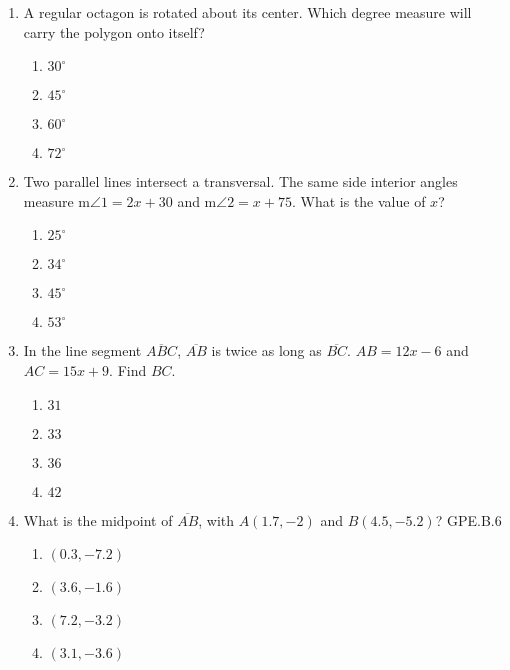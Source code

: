 \begin{enumerate}
\item A regular octagon is rotated about its center. Which degree measure will carry the polygon onto itself? 
\begin{multicols}{2}
\begin{enumerate}
  \item $30^\circ$
  \item $45^\circ$
  \item $60^\circ$
  \item $72^\circ$
\end{enumerate}
\end{multicols}

\item Two parallel lines intersect a transversal. The same side interior angles measure m$\angle 1 = 2x+30$ and m$\angle 2 = x+75$. What is the value of $x$?
\begin{multicols}{2}
  \begin{enumerate}
    \item $25^\circ$
    \item $34^\circ$
    \item $45^\circ$
    \item $53^\circ$
  \end{enumerate}
  \end{multicols}

\newpage
\item In the line segment $\overline{ABC}$, $\overline{AB}$ is twice as long as $\overline{BC}$. $AB=12x-6$ and $AC=15x+9$. Find $BC$.
  \begin{multicols}{2}
  \begin{enumerate}
    \item $31$
    \item $33$
    \item $36$
    \item $42$
  \end{enumerate}
  \end{multicols} \vspace{1cm}

\item What is the midpoint of $\overline{AB}$, with $A(1.7,-2)$ and $B(4.5,-5.2)$? \hfill GPE.B.6
\begin{multicols}{2}
  \begin{enumerate}
    \item $(0.3,-7.2)$
    \item $(3.6,-1.6)$
    \item $(7.2,-3.2)$
    \item $(3.1,-3.6)$
  \end{enumerate}
  \end{multicols} \vspace{1cm}


\end{enumerate}
